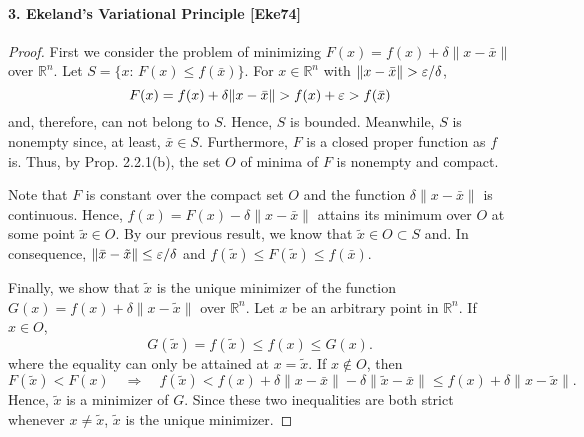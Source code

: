   \paragraph{3. Ekeland's Variational Principle [Eke74]}
  \begin{proof}
    First we consider the problem of minimizing $F(x)=f(x)+\delta\|x-\bar{x}\|$ 
    over $\mathbb{R}^n$. Let $S=\{x:\, F(x)\le f(\bar{x})\}$. For $x\in
    \mathbb{R}^n$ with $\|x-\bar{x}\|>\vep/\delta$,
    \[
      F(x)=f(x)+\delta\|x-\bar{x}\|>f(x)+\vep>f(\bar{x})
    \]
    and, therefore, can not belong to $S$. Hence, $S$ is bounded. Meanwhile, 
    $S$ is nonempty since, at least, $\bar{x}\in S$. Furthermore, $F$ is a 
    closed proper function as $f$ is. Thus, by Prop. 2.2.1(b), the set $O$ of 
    minima of $F$ is nonempty and compact.\par
    Note that $F$ is constant over the compact set $O$ and the function 
    $\delta\|x-\bar{x}\|$ is continuous. Hence, $f(x)=F(x)-\delta\|x-\bar{x}\|$
    attains its minimum over $O$ at some point $\tilde{x}\in O$. By our
    previous result, we know that $\tilde{x}\in O\subset S$ and. In 
    consequence, $\|\bar{x}-\tilde{x}\|\le\varepsilon/\delta$ and $f(\tilde{x})\le 
    F(\tilde{x})\le f(\bar{x})$.\par
    Finally, we show that $\tilde{x}$ is the unique minimizer of the function 
    $G(x)=f(x)+\delta\|x-\tilde{x}\|$ over $\mathbb{R}^n$. Let $x$ be an 
    arbitrary point in $\mathbb{R}^n$. If $x\in O$,
    \[
      G(\tilde{x})=f(\tilde{x})\le f(x)\le G(x).
    \]
    where the equality can only be attained at $x=\tilde{x}$. If $x\notin O$, 
    then
    \begin{equation*}
      F(\tilde{x})<F(x)
      \quad\Rightarrow\quad
      f(\tilde{x})<f(x)+\delta\|x-\bar{x}\|-\delta\|\tilde{x}-\bar{x}\|
      \le f(x)+\delta\|x-\tilde{x}\|.
    \end{equation*}
    Hence, $\tilde{x}$ is a minimizer of $G$. Since these two inequalities are
    both strict whenever $x\ne\tilde{x}$, $\tilde{x}$ is the unique minimizer.
  \end{proof}









